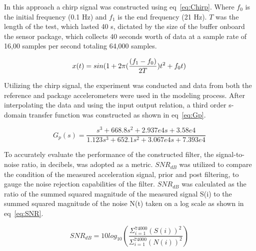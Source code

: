 \documentclass[]{spie}  %
\newcommand{\bl}[1]{\textcolor[rgb]{0.00,0.00,1.00}{#1}}
\begin{document}
	In this approach a chirp signal was constructed using eq~\ref{eq:Chirp}. Where $f_0$ is the initial frequency (0.1 Hz) and $f_1$ is the end frequency (21 Hz). $T$ was the length of the test, which lasted 40 s, dictated by the size of the buffer onboard the sensor package, which collects 40 seconds worth of data at a sample rate of 16,00 samples per second totaling 64,000 samples.
	
	\begin{equation} 
		\label{eq:Chirp}
		x(t)={\normalfont sin}(1 + 2\pi ( \frac{(f_1-f_0)}{2T} ) t^2 + f_0 t) \, 
	\end{equation}
	
	
	Utilizing the chirp signal, the experiment was conducted and data from both the reference and package accelerometers were used in the modeling process. After interpolating the data and using the input output relation, a third order s-domain transfer function was constructed as shown in eq~\ref{eq:Gp}. 
	
	\begin{equation}
		\label{eq:Gp}
		G_p(s) = \frac{s^3  + 668.8 s^2  + 2.937e4 s + 3.58e4}{1.123 s^3  + 652.1 s^2  + 3.067e4 s + 7.393e4} \, 
	\end{equation}

To accurately evaluate the performance of the constructed filter, the signal-to-noise ratio, in decibels, was adopted as a metric. $SNR_{dB}$ was utilized to compare the condition of the measured acceleration signal, prior and post filtering, to gauge the noise rejection capabilities of the filter. $SNR_{dB}$ was calculated as the ratio of the summed squared magnitude of the measured signal S(i) to the summed squared magnitude of the noise N(t) taken on a log scale as shown in eq~\ref{eq:SNR}.~\cite{Johnson2006}

	\begin{equation}
		\label{eq:SNR}
		SNR_{dB} =10log_{10}(\frac{\Sigma^{74000}_{i=1}(S(i))^2}{\Sigma^{74000}_{i=1}(N(i))^2}) \, 
	\end{equation}

	
\end{document}
